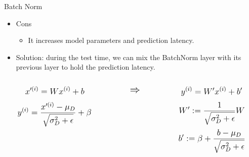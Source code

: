 \documentclass[compress,oilve,t]{beamer}
\begin{document}
\begin{frame}{Batch Norm}
	\begin{itemize}
		\item Cons
		\begin{itemize}
			\item It increases model parameters and prediction latency.
			\medskip
		\end{itemize}
	\end{itemize}
	\begin{itemize}
		\item Solution: during the test time, we can mix the BatchNorm layer with its previous layer to hold the prediction latency.
	\end{itemize}
	\begin{columns}
		\begin{column}[c]{0.45\textwidth}
			\centering
			\begin{equation*}
				\mathlarger{x'^{(i)} = W x^{(i)} + b}
			\end{equation*}
			\begin{equation*}
				\mathlarger{y^{(i)} = \frac{x'^{(i)} - \mu_D}{\sqrt{\sigma_D^2 + \epsilon}} + \beta}
			\end{equation*}
		\end{column}
		\begin{column}[c]{0.1\textwidth}
			\centering
			\begin{equation*}
				\mathlarger{\mathlarger{
						\Rightarrow
				}}
			\end{equation*}
		\end{column}
		\begin{column}[c]{0.45\textwidth}
			\centering
			\begin{equation*}
				\mathlarger{y^{(i)} = W' x^{(i)} + b'}
			\end{equation*}
			\begin{equation*}
				\mathlarger{
					W' := \frac{1}{\sqrt{\sigma_D^2 + \epsilon}} W	
				}
			\end{equation*}
			\begin{equation*}
				\mathlarger{
					b' := \beta + \frac{b- \mu_D}{\sqrt{\sigma_D^2 + \epsilon}}	
				}
			\end{equation*}
		\end{column}
	\end{columns}
\end{frame}
\end{document}
